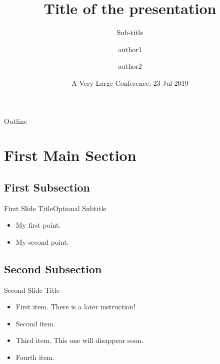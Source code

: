 \documentclass[xcolor=dvipsnames]{beamer}
\title{Title of the presentation}
\subtitle{Sub-title}
\author[author]
{author1\inst{1} \and author2\inst{2}}
\institute[SJTU] %
{
  \inst{1}%
  Department of Electric Engineering\\
  Shanghai Jiao Tong University
  \and
  \inst{2} %
  Department of Computer Science\\
  Shanghai Jiao Tong University
}
\date{A Very Large Conference, 23 Jul 2019}
\begin{document}
\begin{frame}
  \titlepage
\end{frame}


\begin{frame}{Outline}
  \tableofcontents
\end{frame}

\section{First Main Section}

\subsection{First Subsection}
\begin{frame}{First Slide Title}{Optional Subtitle}
  \begin{itemize}
  \item {
    My first point.
  }
  \item {
    My second point.
  }
  \end{itemize}
\end{frame}

\subsection{Second Subsection}
\begin{frame}{Second Slide Title}
  \begin{itemize}
  \item {
    First item.
    \pause %
    There is a later instruction!
    \pause
  }
  \item<3-> Second item.
  \item<4> Third item. This one will disappear soon.
  \item<5-> {
    Fourth item. 
  }
  \end{itemize}
\end{frame}
\end{document}
